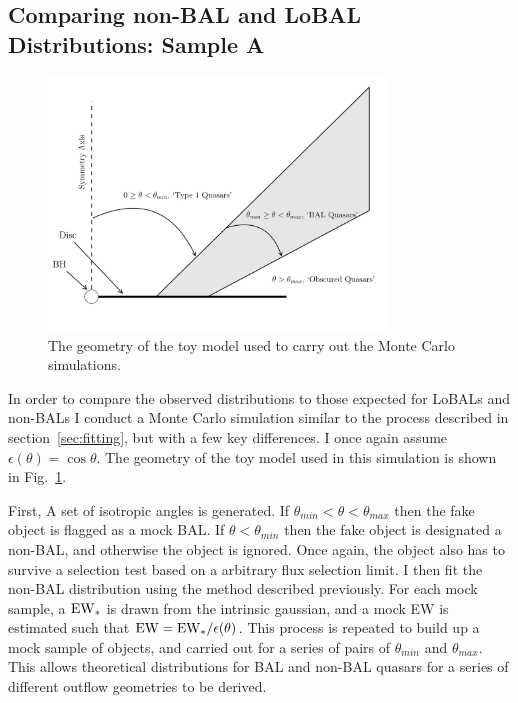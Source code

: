 \subsection{Comparing non-BAL and LoBAL Distributions: Sample A}
\label{sec:bal_v_nonbal}

\begin{figure}
\centering
\includegraphics[width=0.8\textwidth]{figures/ewpaper/fig2_cartoon.png}
\caption
{
The geometry of the toy model used to carry out the Monte Carlo simulations.
}
\label{fig:cartoon}
\end{figure}


In order to compare the observed distributions to those expected for LoBALs and
non-BALs I conduct a Monte Carlo simulation similar to
the process described in section~\ref{sec:fitting}, but with a few 
key differences. I once again assume $\epsilon(\theta) = \cos \theta$.
The geometry of the toy model used in this simulation is shown in
Fig.~\ref{fig:cartoon}.

First, A set of isotropic angles is generated.
If $\theta_{min}<\theta<\theta_{max}$ then the fake object 
is flagged as a mock BAL. If $\theta<\theta_{min}$ then the 
fake object is designated a non-BAL, and otherwise
the object is ignored. Once again, the object also has to 
survive a selection test based on a arbitrary flux selection limit.
I then fit the non-BAL distribution using the method described previously.
For each mock sample, a ${\rm EW}_*$ is drawn from the intrinsic gaussian,
and a mock EW is estimated such that ${\rm EW} = {\rm EW}_* / \epsilon(\theta)$.
This process is repeated to build up a mock sample of objects, and 
carried out for a series of pairs of $\theta_{min}$ and $\theta_{max}$.
This allows theoretical distributions for BAL and non-BAL quasars
for a series of different outflow geometries to be derived.

